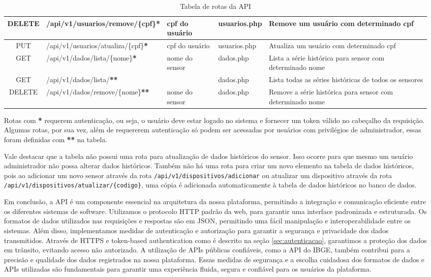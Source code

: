 \documentclass[tcc,capa]{texufpel}
\begin{document}
\begin{table}[h]
{\begin{tabular}{|c|l|l|l|p{7cm}|}
\hline
DELETE & /api/v1/usuarios/remove/\{cpf\}\textbf{*} & cpf do usuário & usuarios.php & Remove um usuário com determinado cpf\\
\hline
PUT & /api/v1/usuarios/atualiza/\{cpf\}\textbf{*} & cpf do usuário & usuarios.php & Atualiza um usuário com determinado cpf\\
\hline
GET & /api/v1/dados/lista/\{nome\}\textbf{*} & nome do sensor & dados.php & Lista a série histórica para sensor com determinado nome\\
\hline
GET & /api/v1/dados/lista/\textbf{**} & & dados.php & Lista todas as séries históricas de todos os sensores\\
\hline
DELETE & /api/v1/dados/remove/\{nome\}\textbf{**} & nome do sensor & dados.php & Remove a série histórica para sensor com determinado nome\\
\hline
\end{tabular}}
\caption{Tabela de rotas da API}
\label{tab:rotas-api}
\end{table}
\newpage
Rotas com \textbf{*} requerem autenticação, ou seja, o usuário deve estar logado no sistema e fornecer um token válido no cabeçalho da requisição. Algumas rotas, por sua vez, além de requererem autenticação só podem ser acessadas por usuários com privilégios de administrador, essas foram definidas com \textbf{**} na tabela.

Vale destacar que a tabela não possui uma rota para atualização de dados históricos do sensor. Isso ocorre para que mesmo um usuário administrador não possa alterar dados históricos. Também não há uma rota para criar um novo elemento na tabela de dados históricos, pois ao adicionar um novo sensor através da rota \verb|/api/v1/dispositivos/adicionar| ou atualizar um dispositivo através da rota \verb|/api/v1/dispositivos/atualizar/{codigo}|, uma cópia é adicionada automaticamente à tabela de dados históricos no banco de dados. 

Em conclusão, a API é um componente essencial na arquitetura da nossa plataforma, permitindo a integração e comunicação eficiente entre os diferentes sistemas de software. Utilizamos o protocolo HTTP padrão da web, para garantir uma interface padronizada e estruturada. Os formatos de dados utilizados nas requisições e respostas são em JSON, permitindo uma fácil manipulação e interoperabilidade entre os sistemas. Além disso, implementamos medidas de autenticação e autorização para garantir a segurança e privacidade dos dados transmitidos. Através de HTTPS e token-based authentication como é descrito na seção \ref{sec:autenticacao}, garantimos a proteção dos dados em trânsito, evitando acesso não autorizado. A utilização de APIs públicas confiáveis, como a API do IBGE, também contribui para a precisão e qualidade dos dados registrados na nossa plataforma. Essas medidas de segurança e a escolha cuidadosa dos formatos de dados e APIs utilizadas são fundamentais para garantir uma experiência fluida, segura e confiável para os usuários da plataforma.
\end{document}
